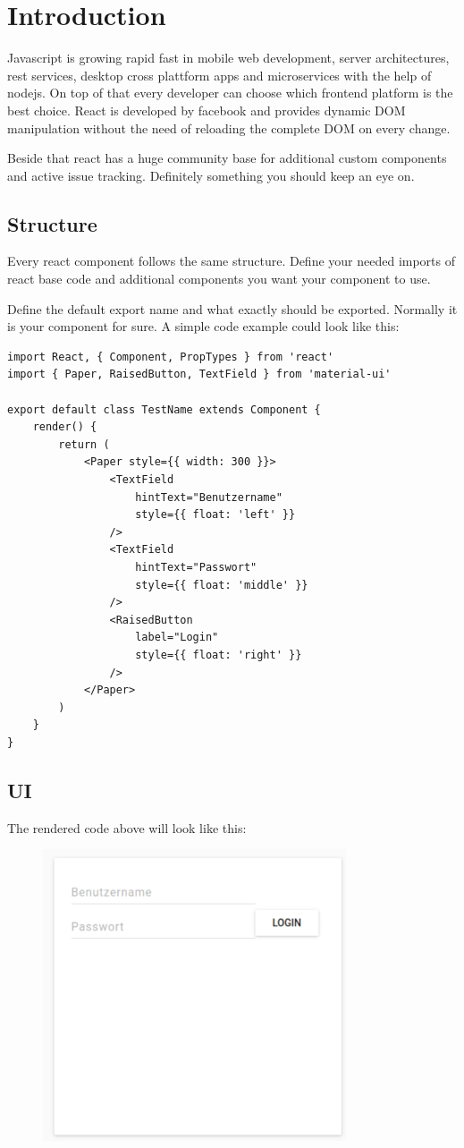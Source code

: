 \chapter{Introduction}
Javascript is growing rapid fast in mobile web development, server architectures, rest services, desktop cross plattform apps and microservices with the help of nodejs. On top of that every developer can choose which frontend platform is the best choice. React is developed by facebook and provides dynamic DOM manipulation without the need of reloading the complete DOM on every change.

Beside that react has a huge community base for additional custom components and active issue tracking. Definitely something you should keep an eye on.

\section{Structure}
Every react component follows the same structure. Define your needed imports of react base code and additional components you want your component to use.

Define the default export name and what exactly should be exported. Normally it is your component for sure. A simple code example could look like this:

\begin{lstlisting}
import React, { Component, PropTypes } from 'react'
import { Paper, RaisedButton, TextField } from 'material-ui'

export default class TestName extends Component {
	render() {
		return (
			<Paper style={{ width: 300 }}>
				<TextField
					hintText="Benutzername"
					style={{ float: 'left' }}
				/>
				<TextField
					hintText="Passwort"
					style={{ float: 'middle' }}
				/>
				<RaisedButton
					label="Login"
					style={{ float: 'right' }}
				/>
			</Paper>
		)
	}
}
\end{lstlisting}

\section{UI}
The rendered code above will look like this:
  \begin{figure}[htb!]
	\centerline{\includegraphics[width=0.8\textwidth]{resources/preview.png}}
\end{figure}